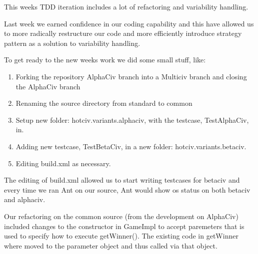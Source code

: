 \begin{comment}
A short outline of the TDD refactoring iteration that refactors your AlphaCiv variant into a design that will support the BetaCiv requirement (not the actual BetaCiv feature adding iteration!) }
\end{comment}

\begin{comment}
Thise are some exerpts from our devlog describing refactoring steps from our development on our:


\logInputfile{39}{42}{../../BetaCiv/Devlog.txt}
\logInputfile{51}{76}{../../BetaCiv/Devlog.txt}

So we basically just implemented the betaciv getWinner() in a strategy pattern, and, because the implementing strategy required knowledge about the the age of game, we let the strategy require a parameter specifying the age.



\end{comment}

This weeks TDD iteration includes a lot of refactoring and variability handling.

Last week we earned confidence in our coding capability and this have allowed us to more radically restructure our code and more efficiently introduce strategy pattern as a solution to variability handling.

To get ready to the new weeks work we did some small stuff, like:
\begin{enumerate} \itemsep1pt \parskip0pt 
\item Forking the repository AlphaCiv branch into a Multiciv branch and closing the AlphaCiv branch
\item Renaming the source directory from standard to common
\item Setup new folder: hotciv.variants.alphaciv, with the testcase, TestAlphaCiv, in.
\item Adding new testcase, TestBetaCiv, in a new folder: hotciv.variants.betaciv.
\item Editing build.xml as necessary.
\end{enumerate}

The editing of build.xml allowed us to start writing testcases for betaciv and every time we ran Ant on our source, Ant would show os status on both betaciv and alphaciv.

Our refactoring on the common source (from the development on AlphaCiv) included changes to the constructor in GameImpl to accept paremeters that is used to specify how to execute getWinner(). 
The existing code in getWinner where moved to the parameter object and thus called via that object.


